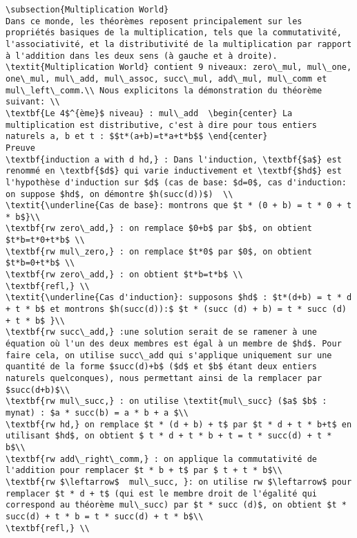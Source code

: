 \begin{verbatim}
\subsection{Multiplication World}
Dans ce monde, les théorèmes reposent principalement sur les propriétés basiques de la multiplication, tels que la commutativité, l'associativité, et la distributivité de la multiplication par rapport à l'addition dans les deux sens (à gauche et à droite). \textit{Multiplication World} contient 9 niveaux: zero\_mul, mul\_one, one\_mul, mul\_add, mul\_assoc, succ\_mul, add\_mul, mul\_comm et mul\_left\_comm.\\ Nous explicitons la démonstration du théorème suivant: \\
\textbf{Le 4$^{ème}$ niveau} : mul\_add  \begin{center} La multiplication est distributive, c'est à dire pour tous entiers naturels a, b et t : $$t*(a+b)=t*a+t*b$$ \end{center}
Preuve
\textbf{induction a with d hd,} : Dans l'induction, \textbf{$a$} est renommé en \textbf{$d$} qui varie inductivement et \textbf{$hd$} est l'hypothèse d'induction sur $d$ (cas de base: $d=0$, cas d'induction: on suppose $hd$, on démontre $h(succ(d))$)  \\
\textit{\underline{Cas de base}: montrons que $t * (0 + b) = t * 0 + t * b$}\\
\textbf{rw zero\_add,} : on remplace $0+b$ par $b$, on obtient $t*b=t*0+t*b$ \\
\textbf{rw mul\_zero,} : on remplace $t*0$ par $0$, on obtient $t*b=0+t*b$ \\
\textbf{rw zero\_add,} : on obtient $t*b=t*b$ \\
\textbf{refl,} \\
\textit{\underline{Cas d'induction}: supposons $hd$ : $t*(d+b) = t * d + t * b$ et montrons $h(succ(d)):$ $t * (succ (d) + b) = t * succ (d) + t * b$ }\\
\textbf{rw succ\_add,} :une solution serait de se ramener à une équation où l'un des deux membres est égal à un membre de $hd$. Pour faire cela, on utilise succ\_add qui s'applique uniquement sur une quantité de la forme $succ(d)+b$ ($d$ et $b$ étant deux entiers naturels quelconques), nous permettant ainsi de la remplacer par $succ(d+b)$\\
\textbf{rw mul\_succ,} : on utilise \textit{mul\_succ} ($a$ $b$ : mynat) : $a * succ(b) = a * b + a $\\
\textbf{rw hd,} on remplace $t * (d + b) + t$ par $t * d + t * b+t$ en utilisant $hd$, on obtient $ t * d + t * b + t = t * succ(d) + t * b$\\
\textbf{rw add\_right\_comm,} : on applique la commutativité de l'addition pour remplacer $t * b + t$ par $ t + t * b$\\
\textbf{rw $\leftarrow$  mul\_succ, }: on utilise rw $\leftarrow$ pour remplacer $t * d + t$ (qui est le membre droit de l'égalité qui correspond au théorème mul\_succ) par $t * succ (d)$, on obtient $t * succ(d) + t * b = t * succ(d) + t * b$\\
\textbf{refl,} \\

\end{verbatim}
